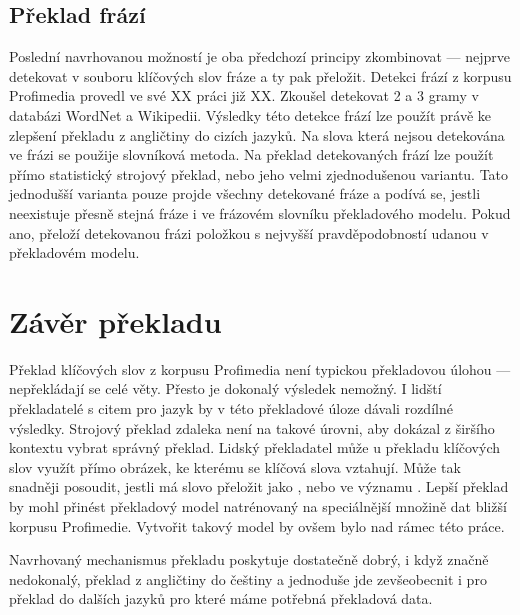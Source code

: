 \subsection{Překlad frází}

Poslední navrhovanou možností je oba předchozí principy zkombinovat --- nejprve detekovat v souboru klíčových slov fráze a ty pak přeložit. Detekci frází z korpusu Profimedia provedl ve své XX práci již XX. Zkoušel detekovat 2 a 3 gramy v databázi WordNet a Wikipedii. Výsledky této detekce frází lze použít právě ke zlepšení překladu z angličtiny do cizích jazyků. Na slova která nejsou detekována ve frázi se použije slovníková metoda. Na překlad detekovaných frází lze použít přímo statistický strojový překlad, nebo jeho velmi zjednodušenou variantu. Tato jednodušší varianta pouze projde všechny detekované fráze a podívá se, jestli neexistuje přesně stejná fráze i ve frázovém slovníku překladového modelu. Pokud ano, přeloží detekovanou frázi položkou s nejvyšší pravděpodobností udanou v překladovém modelu.

\section{Závěr překladu}

Překlad klíčových slov z korpusu Profimedia není typickou překladovou úlohou --- nepřekládají se celé věty. Přesto je dokonalý výsledek nemožný. I lidští překladatelé s citem pro jazyk by v této překladové úloze dávali rozdílné výsledky. Strojový překlad zdaleka není na takové úrovni, aby dokázal z širšího kontextu vybrat správný překlad. Lidský překladatel může u překladu klíčových slov využít přímo obrázek, ke kterému se klíčová slova vztahují. Může tak snadněji posoudit, jestli má slovo  přeložit jako , nebo ve významu . Lepší překlad by mohl přinést překladový model natrénovaný na speciálnější množině dat bližší korpusu Profimedie. Vytvořit takový model by ovšem bylo nad rámec této práce.

Navrhovaný mechanismus překladu poskytuje dostatečně dobrý, i když značně nedokonalý, překlad z angličtiny do češtiny a jednoduše jde zevšeobecnit i pro překlad do dalších jazyků pro které máme potřebná překladová data.

